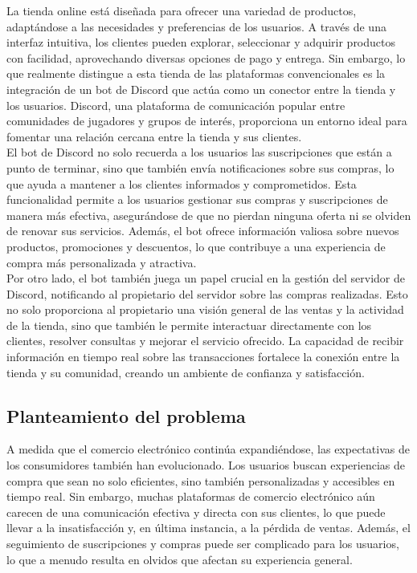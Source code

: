 \documentclass[a4paper,12pt]{article}
\begin{document}
    La tienda online está diseñada para ofrecer una variedad de productos, adaptándose a las necesidades y preferencias de los usuarios. A través de una interfaz intuitiva, los clientes pueden explorar, seleccionar y adquirir productos con facilidad, aprovechando diversas opciones de pago y entrega. Sin embargo, lo que realmente distingue a esta tienda de las plataformas convencionales es la integración de un bot de Discord que actúa como un conector entre la tienda y los usuarios. Discord, una plataforma de comunicación popular entre comunidades de jugadores y grupos de interés, proporciona un entorno ideal para fomentar una relación cercana entre la tienda y sus clientes.\\
    
    El bot de Discord no solo recuerda a los usuarios las suscripciones que están a punto de terminar, sino que también envía notificaciones sobre sus compras, lo que ayuda a mantener a los clientes informados y comprometidos. Esta funcionalidad permite a los usuarios gestionar sus compras y suscripciones de manera más efectiva, asegurándose de que no pierdan ninguna oferta ni se olviden de renovar sus servicios. Además, el bot ofrece información valiosa sobre nuevos productos, promociones y descuentos, lo que contribuye a una experiencia de compra más personalizada y atractiva.\\
    
    Por otro lado, el bot también juega un papel crucial en la gestión del servidor de Discord, notificando al propietario del servidor sobre las compras realizadas. Esto no solo proporciona al propietario una visión general de las ventas y la actividad de la tienda, sino que también le permite interactuar directamente con los clientes, resolver consultas y mejorar el servicio ofrecido. La capacidad de recibir información en tiempo real sobre las transacciones fortalece la conexión entre la tienda y su comunidad, creando un ambiente de confianza y satisfacción.
\newpage

\subsection{Planteamiento del problema}
A medida que el comercio electrónico continúa expandiéndose, las expectativas de los consumidores también han evolucionado. Los usuarios buscan experiencias de compra que sean no solo eficientes, sino también personalizadas y accesibles en tiempo real. Sin embargo, muchas plataformas de comercio electrónico aún carecen de una comunicación efectiva y directa con sus clientes, lo que puede llevar a la insatisfacción y, en última instancia, a la pérdida de ventas. Además, el seguimiento de suscripciones y compras puede ser complicado para los usuarios, lo que a menudo resulta en olvidos que afectan su experiencia general.\\
\end{document}
